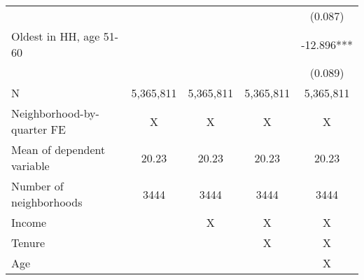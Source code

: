 \begin{tabular}{lcccc}
 &  &  &  & (0.087) \\ 
Oldest in HH, age 51-60 &  &  &  & -12.896*** \\ 
 &  &  &  & (0.089) \\ 
N & 5,365,811 & 5,365,811 & 5,365,811 & 5,365,811 \\ 
Neighborhood-by-quarter FE & X & X & X & X \\ 
Mean of dependent variable & 20.23 & 20.23 & 20.23 & 20.23 \\ 
Number of neighborhoods & 3444 & 3444 & 3444 & 3444 \\ 
Income &  & X & X & X \\ 
Tenure &  &  & X & X \\ 
Age &  &  &  & X \\ 
\bottomrule
\end{tabular}